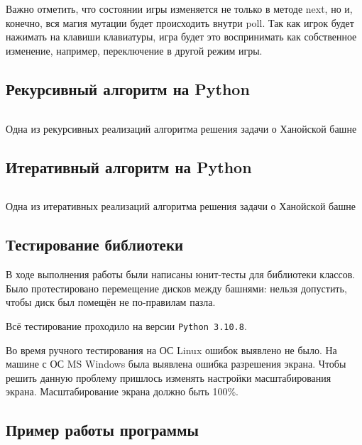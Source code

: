 Важно отметить, что состоянии игры изменяется не только в методе next, но и,
конечно, вся магия мутации будет происходить внутри poll. Так как игрок будет
нажимать на клавиши клавиатуры, игра будет это воспринимать как собственное
изменение, например, переключение в другой режим игры.

\subsection{Рекурсивный алгоритм на Python}

\begin{code}
	\inputminted[breaklines=true, xleftmargin=1em, linenos, frame=single,
		framesep=10pt, fontsize=\footnotesize, firstline=119,
		lastline=137]{python}{../src/src/gamestate.py}
	\caption{Одна из рекурсивных реализаций алгоритма решения задачи о Ханойской
		башне}
\end{code}


\subsection{Итеративный алгоритм на Python}

\begin{code}
	\inputminted[breaklines=true, xleftmargin=1em, linenos, frame=single,
		framesep=10pt, fontsize=\footnotesize, firstline=139,
		lastline=168]{python}{../src/src/gamestate.py}
	\caption{Одна из итеративных реализаций алгоритма решения задачи о Ханойской
		башне}
\end{code}

\subsection{Тестирование библиотеки}

В ходе выполнения работы были написаны юнит-тесты для библиотеки классов.
Было протестировано перемещение дисков между башнями: нельзя допустить, чтобы
диск был помещён не по-правилам пазла.

Всё тестирование проходило на версии \verb|Python 3.10.8|.

Во время ручного тестирования на ОС Linux ошибок выявлено не было.
На машине с ОС MS Windows была выявлена ошибка разрешения экрана.
Чтобы решить данную проблему пришлось изменять настройки масштабирования экрана.
Масштабирование экрана должно быть 100\%.

\subsection{Пример работы программы}

